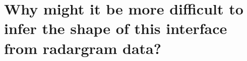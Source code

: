 \documentclass[twosides]{EOSC350Lab} %
\newcommand{\TODO}[1]{{\color{red}#1}}
\begin{document}
		\part{Why might it be more difficult to infer the shape of this interface from radargram data?}


	\vspace{40pt}








\end{document}

